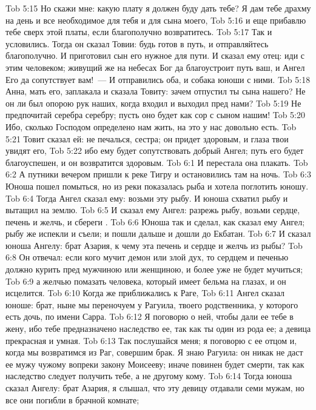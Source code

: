 \vs Tob 5:15 Но скажи мне: какую плату я должен буду дать тебе? Я дам тебе драхму на день и все необходимое для тебя и для сына моего,
\vs Tob 5:16 и еще прибавлю тебе сверх этой платы, если благополучно возвратитесь.
\vs Tob 5:17 Так и условились. Тогда он сказал Товии: будь готов в путь, и отправляйтесь благополучно. И приготовил сын его нужное для пути. И сказал ему отец: иди с этим человеком; живущий же на небесах Бог да благоустроит путь ваш, и Ангел Его да сопутствует вам!~--- И отправились оба, и собака юноши с ними.
\rsbpar\vs Tob 5:18 Анна, мать его, заплакала и сказала Товиту: зачем отпустил ты сына нашего? Не он ли был опорою рук наших, когда входил и выходил пред нами?
\vs Tob 5:19 Не предпочитай серебра серебру; пусть оно будет как сор  с сыном нашим!
\vs Tob 5:20 Ибо, сколько Господом определено нам жить, на это у нас довольно есть.
\vs Tob 5:21 Товит сказал ей: не печалься, сестра; он придет здоровым, и глаза твои увидят его,
\vs Tob 5:22 ибо ему будет сопутствовать добрый Ангел; путь его будет благоуспешен, и он возвратится здоровым.
\vs Tob 6:1 И перестала она плакать.
\vs Tob 6:2 А путники вечером пришли к реке Тигру и остановились там на ночь.
\vs Tob 6:3 Юноша пошел помыться, но из реки показалась рыба и хотела поглотить юношу.
\vs Tob 6:4 Тогда Ангел сказал ему: возьми эту рыбу. И юноша схватил рыбу и вытащил на землю.
\vs Tob 6:5 И сказал ему Ангел: разрежь рыбу, возьми сердце, печень и желчь, и сбереги .
\vs Tob 6:6 Юноша так и сделал, как сказал ему Ангел; рыбу же испекли и съели; и пошли дальше и дошли до Екбатан.
\vs Tob 6:7 И сказал юноша Ангелу: брат Азария, к чему эта печень и сердце и желчь из рыбы?
\vs Tob 6:8 Он отвечал: если кого мучит демон или злой дух, то сердцем и печенью должно курить пред  мужчиною или женщиною, и более уже не будет мучиться;
\vs Tob 6:9 а желчью помазать человека, который имеет бельма на глазах, и он исцелится.
\vs Tob 6:10 Когда же приближались к Раге,
\vs Tob 6:11 Ангел сказал юноше: брат, ныне мы переночуем у Рагуила, твоего родственника, у которого есть дочь, по имени Сарра.
\vs Tob 6:12 Я поговорю о ней, чтобы дали ее тебе в жену, ибо тебе предназначено наследство ее, так как ты один из рода ее; а девица прекрасная и умная.
\vs Tob 6:13 Так послушайся меня; я поговорю с ее отцом и, когда мы возвратимся из Раг, совершим брак. Я знаю Рагуила: он никак не даст ее мужу чужому вопреки закону Моисееву; иначе повинен будет смерти, так как наследство следует получить тебе, а не другому кому.
\vs Tob 6:14 Тогда юноша сказал Ангелу: брат Азария, я слышал, что эту девицу отдавали семи мужам, но все они погибли в брачной комнате;
